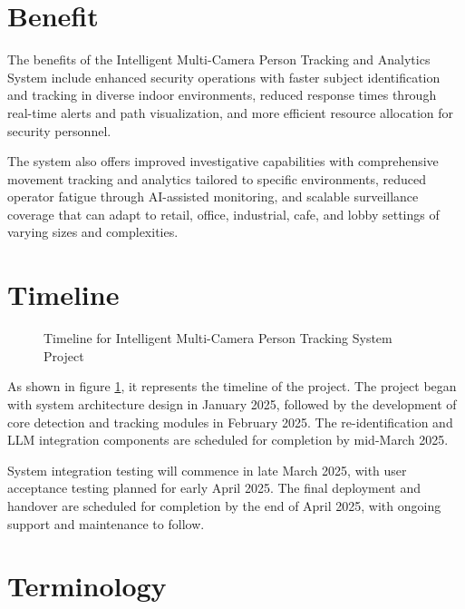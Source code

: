 \newpage

\section{Benefit}
\label{section:benefit}

The benefits of the Intelligent Multi-Camera Person Tracking and Analytics System include enhanced security operations
with faster subject identification and tracking in diverse indoor environments, reduced response times through real-time alerts and path visualization,
and more efficient resource allocation for security personnel.

The system also offers improved investigative capabilities with comprehensive movement tracking and analytics tailored to specific environments,
reduced operator fatigue through AI-assisted monitoring, and scalable surveillance coverage that can adapt to
retail, office, industrial, cafe, and lobby settings of varying sizes and complexities.

\section{Timeline}
\label{section:timeline}

\begin{figure}[h!]
    \centering
    \caption{Timeline for Intelligent Multi-Camera Person Tracking System Project}
    \label{fig:timeline}
\end{figure}

As shown in figure \ref{fig:timeline}, it represents the timeline of the project.
The project began with system architecture design in January 2025, followed by the development of core detection
and tracking modules in February 2025. The re-identification and LLM integration components are scheduled for
completion by mid-March 2025.

System integration testing will commence in late March 2025, with user acceptance testing planned for early April 2025.
The final deployment and handover are scheduled for completion by the end of April 2025, with ongoing support
and maintenance to follow.

\section{Terminology}
\label{section:terminology}

